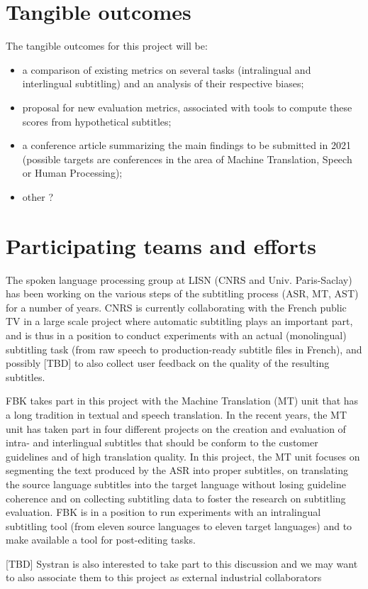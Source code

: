 \documentclass{article}
\begin{document}
\section{Tangible outcomes \label{sec:outcome}}

The tangible outcomes for this project will be:
\begin{itemize}
    \item a comparison of existing metrics on several tasks (intralingual and interlingual subtitling) and an analysis of their respective biases;
    \item proposal for new evaluation metrics, associated with tools to compute these scores from hypothetical subtitles;
    \item a conference article summarizing the main findings to be submitted in 2021 (possible targets are conferences in the area of Machine Translation, Speech or Human Processing);
    \item other ?
\end{itemize}

\section{Participating teams and efforts}

The spoken language processing group at LISN (CNRS and Univ. Paris-Saclay) has been working on the various steps of the subtitling process (ASR, MT, AST) for a number of years. CNRS is currently collaborating with the French public TV in a large scale project where automatic subtitling plays an important part, and is thus in a position to conduct experiments with an actual (monolingual) subtitling task (from raw speech to production-ready subtitle files in French), and possibly [TBD] to also collect user feedback on the quality of the resulting subtitles.

FBK takes part in this project with the Machine Translation (MT) unit that has a long tradition in textual and speech translation. In the recent years, the MT unit has taken part in four different projects on the creation and evaluation of intra- and interlingual subtitles that should be conform to the customer guidelines and of high translation quality. In this project, the MT unit focuses on segmenting the text produced by the ASR into proper subtitles,  on translating the source language subtitles into the target language without losing guideline coherence and on collecting subtitling data to foster the research on subtitling evaluation. FBK is in a position to run experiments with an intralingual subtitling tool (from eleven source languages to eleven target languages) and to make available a tool for post-editing tasks.

[TBD] Systran is also interested to take part to this discussion and we may want to also associate them to this project as external industrial collaborators



\end{document}
